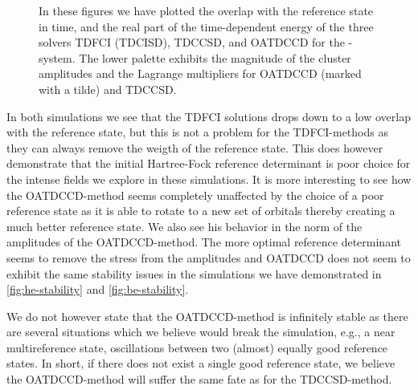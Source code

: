 \begin{figure}
            \caption{In these figures we have plotted the overlap with the
            reference state in time, and the real part of the time-dependent
            energy of the three solvers TDFCI (TDCISD), TDCCSD, and OATDCCD for
            the -system.
            The lower palette exhibits the magnitude of the cluster amplitudes
            and the Lagrange multipliers for OATDCCD (marked with a tilde) and
            TDCCSD.}
            \label{fig:be-stability}
        \end{figure}
        In both simulations we see that the TDFCI solutions drops down to a low
        overlap with the reference state, but this is not a problem for the
        TDFCI-methods as they can always remove the weigth of the reference
        state.
        This does however demonstrate that the initial Hartree-Fock reference
        determinant is poor choice for the intense fields we explore in these
        simulations.
        It is more interesting to see how the OATDCCD-method seems completely
        unaffected by the choice of a poor reference state as it is able to
        rotate to a new set of orbitals thereby creating a much better reference
        state.
        We also see his behavior in the norm of the amplitudes of the
        OATDCCD-method.
        The more optimal reference determinant seems to remove the stress from
        the amplitudes and OATDCCD does not seem to exhibit the same stability
        issues in the simulations we have demonstrated in
        \autoref{fig:he-stability} and \autoref{fig:be-stability}.

        We do not however state that the OATDCCD-method is infinitely stable as
        there are several situations which we believe would break the
        simulation, e.g., a near multireference state, oscillations between two
        (almost) equally good reference states.
        In short, if there does not exist a single good reference state, we
        believe the OATDCCD-method will suffer the same fate as for the
        TDCCSD-method.


